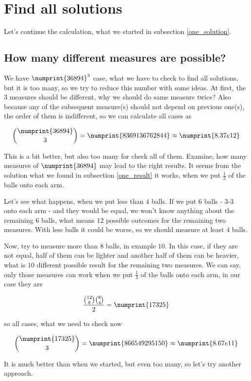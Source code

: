 \documentclass[11pt]{article} %
\begin{document}
\section{Find all solutions}

Let's continue the calculation, what we started in subsection \ref{one_solution}.

\subsection{How many different measures are possible?} \label{how_many}

We have $\numprint{36894}^3$ case, what we have to check to find all solutions, but it is too many, so we try to reduce this number with some ideas. At first, the $3$ measures should be different, why we should do same measure twice? Also because any of the subsequent measure(s) should not depend on previous one(s), the order of them is indifferent, so we can calculate all cases as

\[ \binom{\numprint{36894}}{3} = \numprint{8369136762844} \approx \numprint{8.37e12} \]

This is a bit better, but also too many for check all of them. Examine, how many measures of $\numprint{36894}$ may lead to the right results. It seems from the solution what we found in subsection \ref{one_result} it works, when we put $\frac{1}{3}$ of the balls onto each arm.

Let's see what happens, when we put less than $4$ balls. If we put $6$ balls - $3$-$3$ onto each arm - and they would be equal, we won't know anything about the remaining $6$ balls, what means $12$ possible outcomes for the remaining two measures. With less balls it could be worse, so we should measure at least $4$ balls. 

Now, try to measure more than $8$ balls, in example $10$. In this case, if they are not equal, half of them can be lighter and another half of them can be heavier, what is $10$ different possible result for the remaining two measures. We can say, only those measures can work when we put $\frac{1}{3}$ of the balls onto each arm, in our case they are

\[ \frac{\binom{12}{8}\binom{8}{4}}{2} = \numprint{17325} \]

so all cases, what we need to check now

\[ \binom{\numprint{17325}}{3} = \numprint{866549295150} \approx \numprint{8.67e11} \]

It is much better than when we started, but even too many, so let's try another approach.
\end{document}
